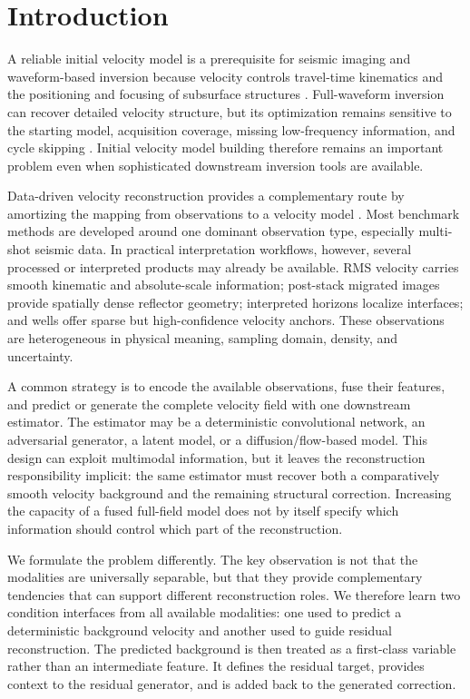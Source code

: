 \documentclass[remotesensing,article,submit,pdftex,moreauthors]{Definitions/mdpi}
\begin{document}
\section{Introduction}

A reliable initial velocity model is a prerequisite for seismic imaging and waveform-based inversion because velocity controls travel-time kinematics and the positioning and focusing of subsurface structures \citep{stolt1978migration,tarantola1984inversion,virieux2009overview}. Full-waveform inversion can recover detailed velocity structure, but its optimization remains sensitive to the starting model, acquisition coverage, missing low-frequency information, and cycle skipping \citep{bunks1995multiscale,virieux2009overview}. Initial velocity model building therefore remains an important problem even when sophisticated downstream inversion tools are available.

Data-driven velocity reconstruction provides a complementary route by amortizing the mapping from observations to a velocity model \citep{yang2019deeplearning,wu2020inversionnet,deng2022openfwi}. Most benchmark methods are developed around one dominant observation type, especially multi-shot seismic data. In practical interpretation workflows, however, several processed or interpreted products may already be available. RMS velocity carries smooth kinematic and absolute-scale information; post-stack migrated images provide spatially dense reflector geometry; interpreted horizons localize interfaces; and wells offer sparse but high-confidence velocity anchors. These observations are heterogeneous in physical meaning, sampling domain, density, and uncertainty.

A common strategy is to encode the available observations, fuse their features, and predict or generate the complete velocity field with one downstream estimator. The estimator may be a deterministic convolutional network, an adversarial generator, a latent model, or a diffusion/flow-based model. This design can exploit multimodal information, but it leaves the reconstruction responsibility implicit: the same estimator must recover both a comparatively smooth velocity background and the remaining structural correction. Increasing the capacity of a fused full-field model does not by itself specify which information should control which part of the reconstruction.

We formulate the problem differently. The key observation is not that the modalities are universally separable, but that they provide complementary tendencies that can support different reconstruction roles. We therefore learn two condition interfaces from all available modalities: one used to predict a deterministic background velocity and another used to guide residual reconstruction. The predicted background is then treated as a first-class variable rather than an intermediate feature. It defines the residual target, provides context to the residual generator, and is added back to the generated correction.
\end{document}
